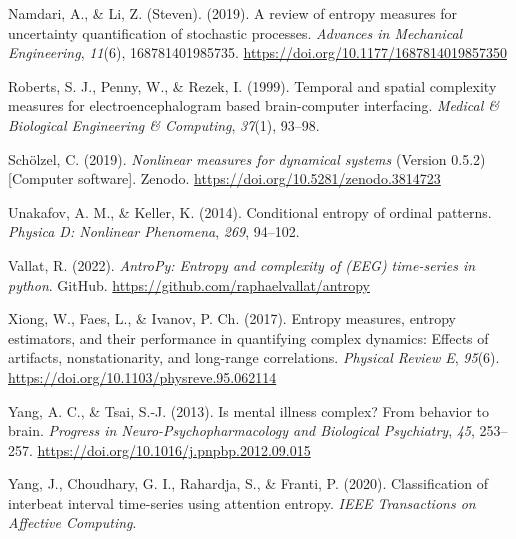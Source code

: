 \documentclass[
  man]{apa6}
\newlength{\cslhangindent}
\newlength{\cslentryspacingunit} %
\newenvironment{CSLReferences}[2] %
 {%
  \setlength{\parindent}{0pt}
  \ifodd #1
  \let\oldpar\par
  \def\par{\hangindent=\cslhangindent\oldpar}
  \fi
  \setlength{\parskip}{#2\cslentryspacingunit}
 }%
 {}
\begin{document}
\begin{CSLReferences}{1}{0}
\leavevmode{}%
Namdari, A., \& Li, Z. (Steven). (2019). A review of entropy measures for uncertainty quantification of stochastic processes. \emph{Advances in Mechanical Engineering}, \emph{11}(6), 168781401985735. \url{https://doi.org/10.1177/1687814019857350}

\leavevmode{}%
Roberts, S. J., Penny, W., \& Rezek, I. (1999). Temporal and spatial complexity measures for electroencephalogram based brain-computer interfacing. \emph{Medical \& Biological Engineering \& Computing}, \emph{37}(1), 93--98.

\leavevmode{}%
Schölzel, C. (2019). \emph{Nonlinear measures for dynamical systems} (Version 0.5.2) {[}Computer software{]}. Zenodo. \url{https://doi.org/10.5281/zenodo.3814723}

\leavevmode{}%
Unakafov, A. M., \& Keller, K. (2014). Conditional entropy of ordinal patterns. \emph{Physica D: Nonlinear Phenomena}, \emph{269}, 94--102.

\leavevmode{}%
Vallat, R. (2022). \emph{AntroPy: Entropy and complexity of (EEG) time-series in python}. GitHub. \url{https://github.com/raphaelvallat/antropy}

\leavevmode{}%
Xiong, W., Faes, L., \& Ivanov, P. Ch. (2017). Entropy measures, entropy estimators, and their performance in quantifying complex dynamics: Effects of artifacts, nonstationarity, and long-range correlations. \emph{Physical Review E}, \emph{95}(6). \url{https://doi.org/10.1103/physreve.95.062114}

\leavevmode{}%
Yang, A. C., \& Tsai, S.-J. (2013). Is mental illness complex? From behavior to brain. \emph{Progress in Neuro-Psychopharmacology and Biological Psychiatry}, \emph{45}, 253--257. \url{https://doi.org/10.1016/j.pnpbp.2012.09.015}

\leavevmode{}%
Yang, J., Choudhary, G. I., Rahardja, S., \& Franti, P. (2020). Classification of interbeat interval time-series using attention entropy. \emph{IEEE Transactions on Affective Computing}.

\end{CSLReferences}


\clearpage
\renewcommand{\listfigurename}{Figure captions}
\end{document}
